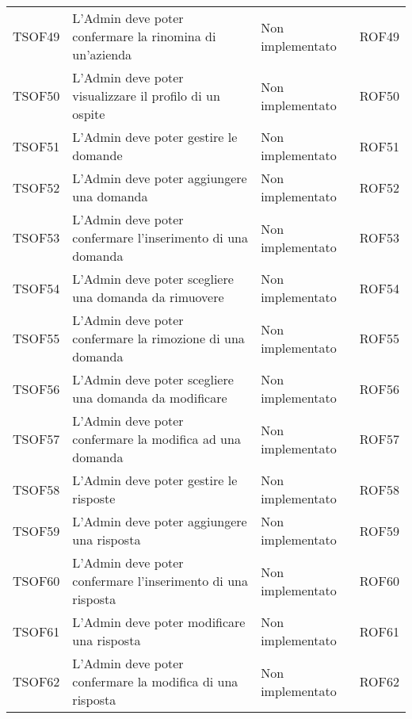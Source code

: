 \documentclass[../PianoDiQualifica_v3.0.0.tex]{subfiles}
\begin{document}
\begin{longtable}[c] { >{\centering\arraybackslash}p{2cm} p{7cm} >{\centering\arraybackslash}p{4cm} >{\centering\arraybackslash}p{2cm}}
			\addlinespace[0.3em]
			\midrule
			\addlinespace[0.3em]
			TSOF49 & L'Admin deve poter confermare la rinomina di un'azienda & Non implementato & ROF49 \\
			\addlinespace[0.3em]
			\midrule
			\addlinespace[0.3em]
			TSOF50 & L'Admin deve poter visualizzare il profilo di un ospite & Non implementato & ROF50 \\
			\addlinespace[0.3em]
			\midrule
			\addlinespace[0.3em]
			TSOF51 & L'Admin deve poter gestire le domande & Non implementato & ROF51 \\
			\addlinespace[0.3em]
			\midrule
			\addlinespace[0.3em]
			TSOF52 & L'Admin deve poter aggiungere una domanda & Non implementato & ROF52 \\
			\addlinespace[0.3em]
			\midrule
			\addlinespace[0.3em]
			TSOF53 & L'Admin deve poter confermare l'inserimento di una domanda & Non implementato & ROF53 \\
			\addlinespace[0.3em]
			\midrule
			\addlinespace[0.3em]
			TSOF54 & L'Admin deve poter scegliere una domanda da rimuovere	& Non implementato & ROF54 \\
			\addlinespace[0.3em]
			\midrule
			\addlinespace[0.3em]
			TSOF55 & L'Admin deve poter confermare la rimozione di una domanda & Non implementato & ROF55 \\
			\addlinespace[0.3em]
			\midrule
			\addlinespace[0.3em]
			TSOF56 & L'Admin deve poter scegliere una domanda da modificare	 & Non implementato & ROF56 \\
			\addlinespace[0.3em]
			\midrule
			\addlinespace[0.3em]
			TSOF57 & L'Admin deve poter confermare la modifica ad una domanda & Non implementato & ROF57 \\
			\addlinespace[0.3em]
			\midrule
			\addlinespace[0.3em]
			TSOF58 & L'Admin deve poter gestire le risposte & Non implementato & ROF58 \\
			\addlinespace[0.3em]
			\midrule
			\addlinespace[0.3em]
			TSOF59 & L'Admin deve poter aggiungere una risposta & Non implementato & ROF59 \\
			\addlinespace[0.3em]
			\midrule
			\addlinespace[0.3em]
			TSOF60 & L'Admin deve poter confermare l'inserimento di una risposta & Non implementato & ROF60 \\
			\addlinespace[0.3em]
			\midrule
			\addlinespace[0.3em]
			TSOF61 & L'Admin deve poter modificare una risposta & Non implementato & ROF61 \\
			\addlinespace[0.3em]
			\midrule
			\addlinespace[0.3em]
			TSOF62 & L'Admin deve poter confermare la modifica di una risposta & Non implementato & ROF62 \\

\end{longtable}
\end{document}
